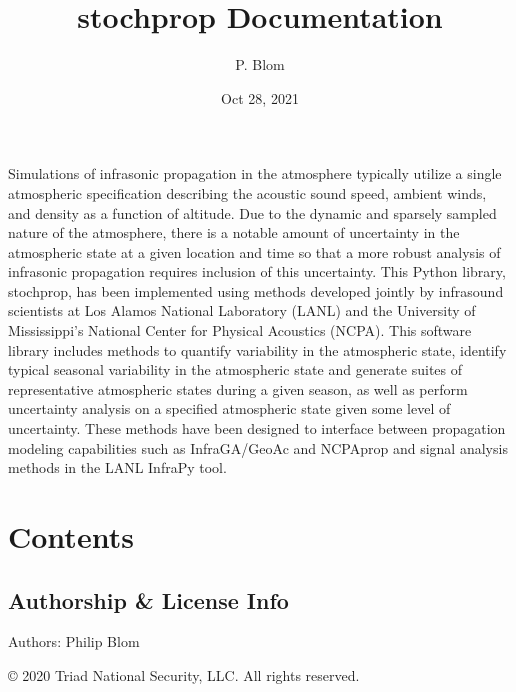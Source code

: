 \documentclass[letterpaper,10pt,english]{sphinxmanual}
\title{stochprop Documentation}
\date{Oct 28, 2021}
\author{P. Blom}
\begin{document}
\pagestyle{empty}
\sphinxmaketitle
\pagestyle{plain}
\sphinxtableofcontents
\pagestyle{normal}
\label{\detokenize{index::doc}}


Simulations of infrasonic propagation in the atmosphere typically utilize a single atmospheric specification describing the acoustic sound speed, ambient winds, and density as a function of altitude.  Due to the dynamic and sparsely sampled nature of the atmosphere, there is a notable amount of uncertainty in the atmospheric state at a given location and time so that a more robust analysis of infrasonic propagation requires inclusion of this uncertainty.  This Python library, stochprop, has been implemented using methods developed jointly by infrasound scientists at Los Alamos National Laboratory (LANL) and the University of Mississippi’s National Center for Physical Acoustics (NCPA).  This software library includes methods to quantify variability in the atmospheric state, identify typical seasonal variability in the atmospheric state and generate suites of representative atmospheric states during a given season, as well as perform uncertainty analysis on a specified atmospheric state given some level of uncertainty.  These methods have been designed to interface between propagation modeling capabilities such as InfraGA/GeoAc and NCPAprop and signal analysis methods in the LANL InfraPy tool.


\chapter{Contents}
\label{\detokenize{index:module-stochprop}}\label{\detokenize{index:contents}}

\section{Authorship \& License Info}
\label{\detokenize{authorship:authorship-license-info}}\label{\detokenize{authorship:authorship}}\label{\detokenize{authorship::doc}}
Authors: Philip Blom

© 2020 Triad National Security, LLC. All rights reserved.
\end{document}
